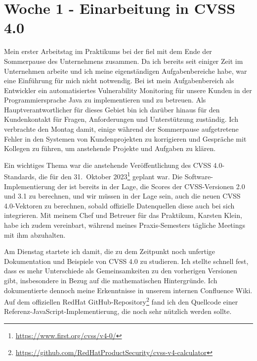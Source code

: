 \section{Woche 1 - Einarbeitung in CVSS 4.0} \label{sec:bericht-wo-1-initial}


\lweekdaymarginpar{\weekdayMondayLong}

Mein erster Arbeitstag im Praktikums bei der {\metaeffekt} fiel mit dem Ende der Sommerpause des Unternehmens zusammen.
Da ich bereits seit einiger Zeit im Unternehmen arbeite und ich meine eigenständigen Aufgabenbereiche habe, war eine Einführung für mich nicht notwendig.
Bei {\metaeffekt} ist mein Aufgabenbereich als Entwickler ein automatisiertes Vulnerability Monitoring für unsere Kunden in der Programmiersprache Java zu implementieren und zu betreuen.
Als Hauptverantwortlicher für dieses Gebiet bin ich darüber hinaus für den Kundenkontakt für Fragen, Anforderungen und Unterstützung zuständig.
Ich verbrachte den Montag damit, einige während der Sommerpause aufgetretene Fehler in den Systemen von Kundenprojekten zu korrigieren und Gespräche mit Kollegen zu führen, um anstehende Projekte und Aufgaben zu klären.

Ein wichtiges Thema war die anstehende Veröffentlichung des CVSS 4.0-Standards, die für den 31.\ Oktober 2023\footnote{\url{https://www.first.org/cvss/v4-0/}} geplant war.
Die Software-Implementierung der {\metaeffekt} ist bereits in der Lage, die Scores der CVSS-Versionen 2.0 und 3.1 zu berechnen, und wir müssen in der Lage sein, auch die neuen CVSS 4.0-Vektoren zu berechnen, sobald offizielle Datenquellen diese auch bei sich integrieren.
Mit meinem Chef und Betreuer für das Praktikum, Karsten Klein, habe ich zudem vereinbart, während meines Praxis-Semesters tägliche Meetings mit ihm abzuhalten.

\sweekdaymarginpar{\weekdayTuesdayLong}

Am Dienstag startete ich damit, die zu dem Zeitpunkt noch unfertige Dokumentation und Beispiele von CVSS 4.0 zu studieren.
Ich stellte schnell fest, dass es mehr Unterschiede als Gemeinsamkeiten zu den vorherigen Versionen gibt, insbesondere in Bezug auf die mathematischen Hintergründe.
Ich dokumentierte dennoch meine Erkenntnisse in unserem internen Confluence Wiki.
Auf dem offiziellen RedHat GitHub-Repository\footnote{\url{https://github.com/RedHatProductSecurity/cvss-v4-calculator}} fand ich den Quellcode einer Referenz-JavaScript-Implementierung, die noch sehr nützlich werden sollte.


